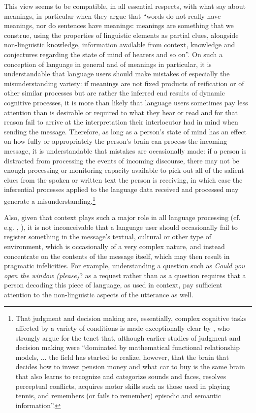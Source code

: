 \documentclass[output=paper]{LSP/langsci}
\begin{document}
  
  This view seems to be compatible, in all essential respects, with what \citet[98]{Croft2004} say about meanings, in particular when they argue that ``words do not really have meanings, nor do sentences have meanings: meanings are something that we construe, using the properties of linguistic elements as partial clues, alongside non-linguistic knowledge, information available from context, knowledge and conjectures regarding the state of mind of hearers and so on''. On such a conception of language in general and of meanings in particular, it is understandable that language users should make mistakes of especially the misunderstanding variety: if meanings are not fixed products of reification or of other similar processes but are rather the inferred end results of dynamic cognitive processes, it is more than likely that language users sometimes pay less attention than is desirable or required to what they hear or read and for that reason fail to arrive at the interpretation their interlocutor had in mind when sending the message. Therefore, as long as a person's state of mind has an effect on how fully or appropriately the person's brain can process the incoming message, it is understandable that mistakes are occasionally made: if a person is distracted from processing the events of incoming discourse, there may not be enough processing or monitoring capacity available to pick out all of the salient clues from the spoken or written text the person is receiving, in which case the inferential processes applied to the language data received and processed may generate a misunderstanding.\footnote{That judgment and decision making are, essentially, complex cognitive tasks affected by a variety of conditions is made exceptionally clear by \citet[54]{Weber2009}, who strongly argue for the tenet that, although earlier studies of judgment and decision making were ``dominated by mathematical functional relationship models, ... the field has started to realize, however, that the brain that decides how to invest pension money and what car to buy is the same brain that also learns to recognize and categorize sounds and faces, resolves perceptual conflicts, acquires motor skills such as those used in playing tennis, and remembers (or fails to remember) episodic and semantic information''.}

   
  Also, given that context plays such a major role in all language processing (cf. e.g. \citealt{Baker2006}, \citealt[34, 45]{Halverson2013}), it is not inconceivable that a language user should occasionally fail to register something in the message's textual, cultural or other type of environment, which is occasionally of a very complex nature, and instead concentrate on the contents of the message itself, which may then result in pragmatic infelicities. For example, understanding a question such as \textit{Could you open the window (please)}? as a request rather than as a question requires that a person decoding this piece of language, as used in context, pay sufficient attention to the non-linguistic aspects of the utterance as well.
\end{document}
